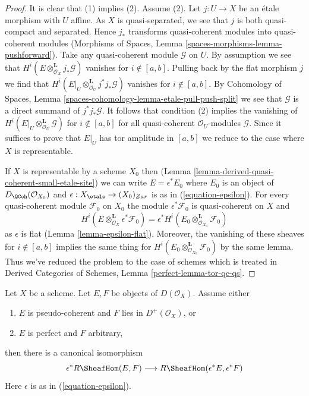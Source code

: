 \begin{proof}
It is clear that (1) implies (2). Assume (2). Let $j : U \to X$ be
an \'etale morphism with $U$ affine. As $X$ is quasi-separated, we
see that $j$ is both quasi-compact and separated.
Hence $j_*$ transforms quasi-coherent
modules into quasi-coherent modules (Morphisms of Spaces, Lemma
\ref{spaces-morphisms-lemma-pushforward}).
Take any quasi-coherent module $\mathcal{G}$ on $U$.
By assumption we see that
$H^i(E \otimes_{\mathcal{O}_X}^\mathbf{L} j_*\mathcal{G})$ vanishes
for $i \not \in [a, b]$. Pulling back by the flat morphism $j$ we find that
$H^i(E|_U \otimes_{\mathcal{O}_U}^\mathbf{L} j^*j_*\mathcal{G})$
vanishes for $i \not \in [a, b]$. By
Cohomology of Spaces, Lemma \ref{spaces-cohomology-lemma-etale-pull-push-split}
we see that $\mathcal{G}$ is a direct summand of $j^*j_*\mathcal{G}$.
It follows that condition (2) implies the vanishing of
$H^i(E|_U \otimes_{\mathcal{O}_U}^\mathbf{L} \mathcal{G})$
for $i \not \in [a, b]$ for all quasi-coherent $\mathcal{O}_U$-modules
$\mathcal{G}$. Since it suffices to prove that $E|_U$ has tor amplitude
in $[a, b]$ we reduce to the case where $X$ is representable.

\medskip\noindent
If $X$ is representable by a scheme $X_0$ then
(Lemma \ref{lemma-derived-quasi-coherent-small-etale-site})
we can write $E = \epsilon^*E_0$ where $E_0$ is an object of
$D_\QCoh(\mathcal{O}_{X_0})$ and
$\epsilon : X_\etale \to (X_0)_{Zar}$ is as in
(\ref{equation-epsilon}). For every quasi-coherent module
$\mathcal{F}_0$ on $X_0$ the module $\epsilon^*\mathcal{F}_0$
is quasi-coherent on $X$ and
$$
H^i(E \otimes_{\mathcal{O}_X}^\mathbf{L} \epsilon^*\mathcal{F}_0)
=
\epsilon^*H^i(E_0 \otimes_{\mathcal{O}_{X_0}}^\mathbf{L} \mathcal{F}_0)
$$
as $\epsilon$ is flat (Lemma \ref{lemma-epsilon-flat}).
Moreover, the vanishing of these sheaves for $i \not \in [a, b]$
implies the same thing for
$H^i(E_0 \otimes_{\mathcal{O}_{X_0}}^\mathbf{L} \mathcal{F}_0)$
by the same lemma. Thus we've reduced the problem to the case
of schemes which is treated in
Derived Categories of Schemes, Lemma \ref{perfect-lemma-tor-qc-qs}.
\end{proof}

\begin{lemma}
\label{lemma-descend-RHom}
Let $X$ be a scheme. Let $E, F$ be objects of $D(\mathcal{O}_X)$.
Assume either
\begin{enumerate}
\item $E$ is pseudo-coherent and $F$ lies in $D^+(\mathcal{O}_X)$, or
\item $E$ is perfect and $F$ arbitrary,
\end{enumerate}
then there is a canonical isomorphism
$$
\epsilon^*R\SheafHom(E, F) \longrightarrow R\SheafHom(\epsilon^*E, \epsilon^*F)
$$
Here $\epsilon$ is as in (\ref{equation-epsilon}).
\end{lemma}

